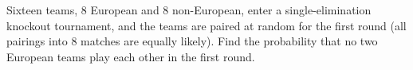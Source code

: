 Sixteen teams, $8$ European and $8$ non-European, enter a single-elimination knockout tournament, and the teams are paired at random for the first round (all pairings into $8$ matches are equally likely). Find the probability that no two European teams play each other in the first round.
